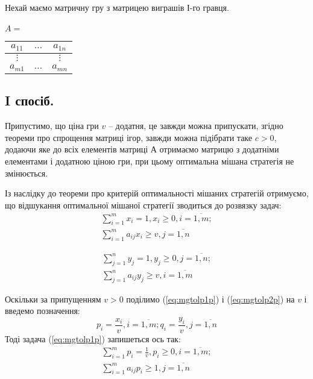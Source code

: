 \documentclass[12pt,a4paper]{book}
\begin{document}
Нехай маємо матричну гру з матрицею виграшів І-го гравця.\\
\\
$A =$
\begin{tabular}{|c|c|c|}
\hline
$a_{1 1}$&$\dots$&$a_{1 n}$\\
\hline
$\vdots$&&$\vdots$\\
\hline
$a_{m 1}$&$\dots$&$a_{m n}$\\
\hline
\end{tabular}

\subsection{I спосіб.}

Припустимо, що ціна гри $v$ – додатня, це завжди можна припускати, згідно теореми про спрощення матриці ігор, завжди можна підібрати таке $c>0$, додаючи яке до всіх елементів матриці $А$ отримаємо матрицю з додатніми елементами і додатною ціною гри, при цьому оптимальна мішана стратегія не змінюється. 

Із наслідку до теореми про критерій оптимальності мішаних стратегій отримуємо, що відшукання оптимальної мішаної стратегії зводиться до розвязку задач:
\begin{equation}
\begin{array}{l}
\displaystyle \sum_{i=1}^m x_i = 1, x_i \geq 0, i=\overline{1,m};\\
\displaystyle \sum_{i=1}^m a_{ij} x_i \geq v,  j=\overline{1,n}
\end{array}
\label{eq:mgtolp1p}
\end{equation}

\begin{equation}
\begin{array}{l}
\displaystyle \sum_{j=1}^n y_j = 1, y_j \geq 0, j=\overline{1,n};\\
\displaystyle \sum_{j=1}^n a_{ij} y_j \geq v,  i=\overline{1,m}
\end{array}
\label{eq:mgtolp2p}
\end{equation}

Оскільки за припущенням $v>0$  поділимо (\ref{eq:mgtolp1p}) і (\ref{eq:mgtolp2p}) на $v$ і введемо позначення:
\[ \displaystyle p_i=\frac{x_i}{v},  i=\overline{1,m}; q_i=\frac{y_i}{v},  j=\overline{1,n} \]
Тоді задача (\ref{eq:mgtolp1p}) запишеться ось так:
\begin{equation}
\begin{array}{l}
\displaystyle \sum_{i=1}^m p_i = \frac{1}{v}, p_i \geq 0, i=\overline{1,m};\\
\displaystyle \sum_{i=1}^m a_{ij} p_i \geq 1,  j=\overline{1,n}
\end{array}
\label{eq:mgtolp1p2}
\end{equation}
\end{document}
